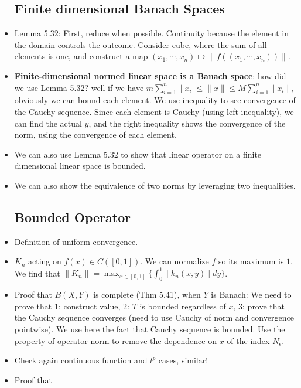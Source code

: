 \documentclass{article}
\theoremstyle{remark}
\begin{document}
\begin{itemize}
\subsection*{Finite dimensional Banach Spaces}
\item Lemma 5.32: First, reduce when possible. Continuity because the element in the domain controls the outcome. Consider cube, where the sum of all elements is one, and construct a map $(x_1,\cdots,x_n)\mapsto\lVert f((x_1,\cdots,x_n))\rVert$.
\item \textbf{Finite-dimensional normed linear space is a Banach space}: how did we use Lemma 5.32? well if we have $m\sum_{i=1}^n \mid x_i\mid\leq \lVert x\rVert\leq M\sum^n_{i=1}\mid x_i\mid$, obviously we can bound each element. We use inequality to see convergence of the Cauchy sequence. Since each element is Cauchy (using left inequality), we can find the actual $y$, and the right inequality shows the convergence of the norm, using the convergence of each element.
\item We can also use Lemma 5.32 to show that linear operator on a finite dimensional linear space is bounded.
\item We can also show the equivalence of two norms by leveraging two inequalities.
\subsection*{Bounded Operator}
\item Definition of uniform convergence.
\item $K_n$ acting on $f(x)\in C([0,1])$. We can normalize $f$ so its maximum is $1$. We find that $\lVert K_n\rVert=\max_{x\in [0,1]}\{\int^1_0\mid k_n (x,y)\mid dy\}$.
\item Proof that $B(X,Y)$ is complete (Thm 5.41), when $Y$ is Banach: We need to prove that 1: construct value, 2: $T$ is bounded regardless of $x$, 3: prove that the Cauchy sequence converges (need to use Cauchy of norm and convergence pointwise). We use here the fact that Cauchy sequence is bounded. Use the property of operator norm to remove the dependence on $x$ of the index $N_\epsilon$.
\item Check again continuous function and $l^p$ cases, similar!
\item Proof that 

\end{itemize}
\end{document}
